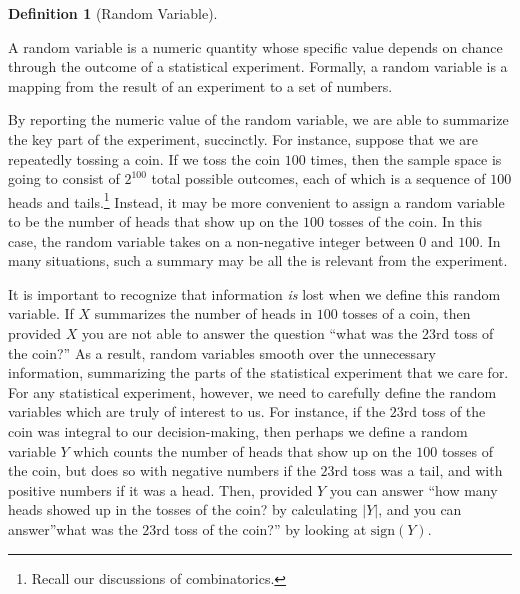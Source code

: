 \documentclass[
  letterpaper,
  DIV=11,
  numbers=noendperiod]{scrreprt}
\theoremstyle{definition}
\theoremstyle{definition}
\theoremstyle{definition}
\newtheorem{definition}{Definition}[chapter]
\theoremstyle{remark}
\begin{document}
\begin{definition}[Random
Variable]\protect\hypertarget{def-random-variable}{}\label{def-random-variable}

A random variable is a numeric quantity whose specific value depends on
chance through the outcome of a statistical experiment. Formally, a
random variable is a mapping from the result of an experiment to a set
of numbers.

\end{definition}

By reporting the numeric value of the random variable, we are able to
summarize the key part of the experiment, succinctly. For instance,
suppose that we are repeatedly tossing a coin. If we toss the coin
\(100\) times, then the sample space is going to consist of \(2^{100}\)
total possible outcomes, each of which is a sequence of \(100\) heads
and tails.\footnote{Recall our discussions of combinatorics.} Instead,
it may be more convenient to assign a random variable to be the number
of heads that show up on the \(100\) tosses of the coin. In this case,
the random variable takes on a non-negative integer between \(0\) and
\(100\). In many situations, such a summary may be all the is relevant
from the experiment.

It is important to recognize that information \emph{is} lost when we
define this random variable. If \(X\) summarizes the number of heads in
\(100\) tosses of a coin, then provided \(X\) you are not able to answer
the question ``what was the 23rd toss of the coin?'' As a result, random
variables smooth over the unnecessary information, summarizing the parts
of the statistical experiment that we care for. For any statistical
experiment, however, we need to carefully define the random variables
which are truly of interest to us. For instance, if the \(23\)rd toss of
the coin was integral to our decision-making, then perhaps we define a
random variable \(Y\) which counts the number of heads that show up on
the \(100\) tosses of the coin, but does so with negative numbers if the
\(23\)rd toss was a tail, and with positive numbers if it was a head.
Then, provided \(Y\) you can answer ``how many heads showed up in the
tosses of the coin? by calculating \(|Y|\), and you can answer''what was
the \(23\)rd toss of the coin?'' by looking at \(\text{sign}(Y)\).
\end{document}
